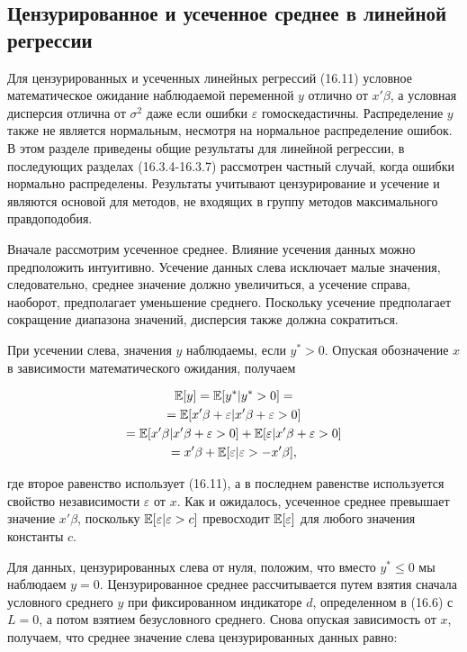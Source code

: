 \subsection{Цензурированное и усеченное среднее в линейной регрессии}


Для цензурированных и усеченных линейных регрессий (16.11) условное математическое ожидание наблюдаемой переменной $y$ отлично от $x'\beta$, а условная дисперсия отлична от $\sigma^2$ даже если ошибки $\varepsilon$ гомоскедастичны. Распределение $y$ также не является нормальным, несмотря на нормальное распределение ошибок. В этом разделе приведены общие результаты для линейной регрессии, в последующих разделах (16.3.4-16.3.7) рассмотрен частный случай, когда ошибки нормально распределены. Результаты учитывают цензурирование и усечение и являются основой для методов, не входящих в группу методов максимального правдоподобия.

Вначале рассмотрим усеченное среднее. Влияние усечения данных можно предположить интуитивно. Усечение данных слева исключает малые значения, следовательно, среднее значение должно увеличиться, а усечение справа, наоборот, предполагает уменьшение среднего. Поскольку усечение предполагает сокращение диапазона значений, дисперсия также должна сократиться.

При усечении слева, значения $y$ наблюдаемы, если $y^* >0$. Опуская обозначение $x$ в зависимости математического ожидания, получаем

\begin{multline}
\mathbb{E}[y]=\mathbb{E}[y^* |y^* >0]=\\
=\mathbb{E}[x'\beta+\varepsilon|x'\beta+\varepsilon>0]\\
=\mathbb{E}[x'\beta|x'\beta+\varepsilon>0]+\mathbb{E}[\varepsilon|x'\beta+\varepsilon>0]\\
=x'\beta+\mathbb{E}[\varepsilon|\varepsilon>-x'\beta],
\end{multline}

где второе равенство использует (16.11), а в последнем равенстве используется свойство независимости $\varepsilon$ от $x$. Как и ожидалось, усеченное среднее превышает значение $x'\beta$, поскольку $\mathbb{E}[\varepsilon|\varepsilon>c]$ превосходит $\mathbb{E}[\varepsilon]$ для любого значения константы $c$.

Для данных, цензурированных слева от нуля, положим, что вместо $y^*  \leq 0$ мы наблюдаем $y=0$. Цензурированное среднее рассчитывается путем взятия сначала условного среднего $y$ при фиксированном индикаторе $d$, определенном в (16.6) с $L=0$, а потом взятием безусловного среднего. Снова опуская зависимость от $x$, получаем, что среднее значение слева цензурированных данных равно:


